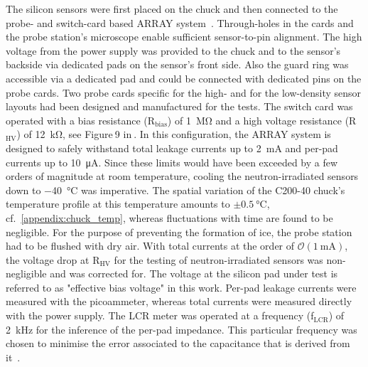The silicon sensors were first placed on the chuck and then connected to the probe- and switch-card based ARRAY system~\cite{pitters:array2019}.
Through-holes in the cards and the probe station's microscope  enable sufficient sensor-to-pin alignment. 
The high voltage from the power supply was provided to the chuck and to the sensor's backside via dedicated pads on the sensor's front side.
Also the guard ring was accessible via a dedicated pad and could be connected with dedicated pins on the probe cards.
Two probe cards specific for the high- and for the low-density sensor layouts had been designed and manufactured for the tests.
The switch card was operated with a bias resistance (R$_\text{bias}$) of \SI{1}{\mega\ohm} and a high voltage resistance (R$_\text{HV}$) of \SI{12}{\kilo\ohm}, see Figure$~$9 in$~$\cite{pitters:array2019}.
In this configuration, the ARRAY system is designed to safely withstand total leakage currents up to \SI{2}{\milli\ampere} and per-pad currents up to \SI{10}{\micro\ampere}.
Since these limits would have been exceeded by a few orders of magnitude at room temperature, cooling the neutron-irradiated sensors down to \SI{-40}{\celsius} was imperative.
The spatial variation of the C200-40 chuck's temperature profile at this temperature amounts to $\pm\SI{0.5}{\celsius}$, cf.~\ref{appendix:chuck_temp}, whereas fluctuations with time are found to be negligible. 
For the purpose of preventing the formation of ice, the probe station had to be flushed with dry air. 
With total currents at the order of $\mathcal{O}(\SI{1}{\milli\ampere})$, the voltage drop at R$_\text{HV}$ for the testing of neutron-irradiated sensors was non-negligible and was corrected for.
The voltage at the silicon pad under test is referred to as "effective bias voltage" in this work.
Per-pad leakage currents were measured with the picoammeter, whereas total currents were measured directly with the power supply.
The LCR meter was operated at a frequency (f$_\text{LCR}$) of \SI{2}{\kilo\hertz} for the inference of the per-pad impedance.
This particular frequency was chosen to minimise the error associated to the capacitance that is derived from it~\cite{pitters:array2019}.

